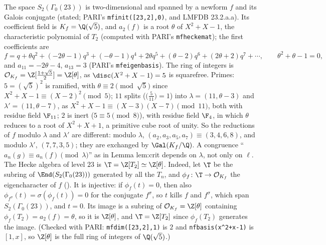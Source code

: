 \begin{example}[level $23$]\label{ex:ant:level23}
The space $S_2(\Gamma_0(23))$ is two-dimensional and spanned by a newform $f$ and its Galois conjugate (stated; PARI's \texttt{mfinit([23,2],0)}, and
LMFDB 23.2.a.a). Its coefficient field is $K_f=\Q(\sqrt5)$, and $a_2(f)$ is a root $\theta$ of $X^2+X-1$, the characteristic polynomial of $T_2$ (computed with
PARI's \texttt{mfheckemat}); the first coefficients are
\[
f=q+\theta q^2+(-2\theta-1)q^3+(-\theta-1)q^4+2\theta q^5+(\theta-2)q^6+(2\theta+2)q^7+\cdots,\qquad\theta^2+\theta-1=0,
\]
and $a_{11}=-2\theta-4$, $a_{13}=3$ (PARI's \texttt{mfeigenbasis}). The ring of integers is $\mathcal O_{K_f}=\Z[\frac{1+\sqrt5}2]=\Z[\theta]$, as $\disc(X^2+X-1)=5$ is
squarefree. Primes: $5=(\sqrt5)^2$ is ramified, with $\theta\equiv2\pmod{\sqrt5}$ since $X^2+X-1\equiv(X-2)^2\pmod5$; $11$ splits ($\bigl(\frac5{11}\bigr)=1$) into
$\lambda=(11,\theta-3)$ and $\lambda'=(11,\theta-7)$, as $X^2+X-1\equiv(X-3)(X-7)\pmod{11}$, both with residue field $\F_{11}$; $2$ is inert ($5\equiv5\pmod8$), with
residue field $\F_4$, in which $\theta$ reduces to a root of $X^2+X+1$, a primitive cube root of unity. So the reductions of $f$ modulo $\lambda$ and
$\lambda'$ are different: modulo $\lambda$, $(a_2,a_3,a_5,a_7)\equiv(3,4,6,8)$, and modulo $\lambda'$, $(7,7,3,5)$; they are exchanged by $\Gal(K_f/\Q)$. A congruence
``$a_n(g)\equiv a_n(f)\pmod\lambda$'' as in Lemma lem:crit depends on $\lambda$, not only on $\ell$. The Hecke algebra of level $23$ is $\T=\Z[T_2]\simeq\Z[\theta]$.
Indeed, let $\T$ be the subring of $\End(S_2(\Gamma_0(23)))$ generated by all the $T_n$, and $\phi_f\colon\T\to\mathcal O_{K_f}$ the eigencharacter of $f$
(). It is injective: if $\phi_f(t)=0$, then also $\phi_{f^\sigma}(t)=\sigma(\phi_f(t))=0$ for the conjugate $f^\sigma$, so $t$ kills $f$ and
$f^\sigma$, which span $S_2(\Gamma_0(23))$, and $t=0$. Its image is a subring of $\mathcal O_{K_f}=\Z[\theta]$ containing $\phi_f(T_2)=a_2(f)=\theta$, so it is
$\Z[\theta]$, and $\T=\Z[T_2]$ since $\phi_f(T_2)$ generates the image. (Checked with PARI: \texttt{mfdim([23,2],1)} is $2$ and \texttt{nfbasis(x\^{}2+x-1)} is
$[1,x]$, so $\Z[\theta]$ is the full ring of integers of $\Q(\sqrt5)$.)
\end{example}

